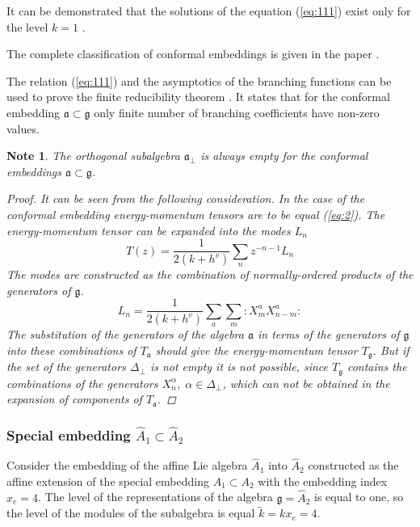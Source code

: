 \documentclass[a4paper,12pt]{article}
\newtheorem{note}{Note}[section]
\theoremstyle{definition} \newtheorem{Def}{Definition}
\begin{document}
It can be demonstrated that the solutions of the equation (\ref{eq:111}) exist only
for the level $k=1$ \cite{difrancesco1997cft}.

The complete classification of conformal embeddings is given in the paper \cite{schellekens1986conformal}.

The relation (\ref{eq:111}) and the asymptotics of the branching functions can be used to prove the finite reducibility theorem \cite{kac1988modular}. It states that for the conformal embedding  $\mathfrak{a}\subset\mathfrak{g}$ only finite number of branching coefficients have non-zero values.

\begin{note} The orthogonal subalgebra $\mathfrak{a}_{\bot}$ is always empty for the conformal embeddings $\mathfrak{a}\subset \mathfrak{g}$.
\begin{proof} It can be seen from the following consideration. In the case of the conformal embedding energy-momentum tensors are to be equal (\ref{eq:2}).
The energy-momentum tensor can be expanded into the modes $L_n$
\begin{equation}
\label{eq:47}
  T(z)=\frac{1}{2(k+h^v)}\sum_n z^{-n-1}L_n
\end{equation}
The modes are constructed as the combination of normally-ordered products of the generators of $\mathfrak{g}$.
\begin{equation}
\label{eq:48}
  L_n=\frac{1}{2(k+h^v)}\sum_a\sum_m:X^a_m X^a_{n-m}:
\end{equation}
The substitution of the generators of the algebra $\mathfrak{a}$  in terms of the generators of $\mathfrak{g}$ into these combinations of $T_{\mathfrak{a}}$ should give the energy-momentum tensor $T_{\mathfrak{g}}$. But if the set of the generators $\Delta_{\bot}$ is not empty it is not possible, since $T_{\mathfrak{g}}$ contains the combinations of the generators $X^{\alpha}_n, \; \alpha\in \Delta_{\bot}$, which can not be obtained in the expansion of components of $T_{\mathfrak{a}}$.
\end{proof}
\end{note}
\subsubsection{Special embedding $\hat{A}_1\subset\hat{A}_2$}
\label{sec:spec-embedd-hata_1s}
Consider the embedding of the affine Lie algebra $\hat{A}_1$ into $\hat{A}_2$ constructed as the affine extension of the special embedding $A_1\subset A_2$ with the embedding index $x_e=4$. The level of the representations of the algebra $\mathfrak{g}=\hat{A}_2$ is equal to one, so the level of the modules of the subalgebra is equal $\tilde{k}=kx_e=4$.
\end{document}
